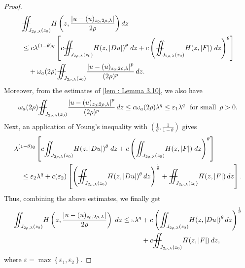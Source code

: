\documentclass[11pt,oneside, english,reqno,twoside a4paper]{amsart}
\theoremstyle{definition}
\numberwithin{theorem}{section}
\numberwithin{equation}{section}
\newcommand{\iintss}{{\int\hspace{-0.28cm}\int}}
\newcommand{ \miints }{{\iintss\hspace{-0.56cm} -\hspace{-0.15cm}-}}
\newcommand{\miint}[1]{{\miints_{\hspace{-0.13cm}#1}}}
\begin{document}
\begin{proof}
\begin{align*}
&\miint{J_{2\rho, \lambda}(z_0)}  H\left(z,\frac{|u-(u)_{z_0, 2\rho, \lambda}|}{2\rho}\right) dz\\
&\leq c \lambda^{(1-\theta)q}\left[c \miint{J_{2\rho,\lambda}(z_0)}H(z,|Du|)^{\theta}\; dz +c\left(\miint{J_{2\rho,\lambda}(z_0)}H(z,|F|)\; d z\right)^{\theta}\right] \\
&\quad +\omega_a(2\rho)\miint{J_{2\rho, \lambda}(z_0)}\frac{\left|u-(u)_{z_0 ; 2 \rho,\lambda}\right|^p}{(2 \rho)^p}\,dz.
\end{align*}
Moreover, from the estimates of  \cref{lem : Lemma 3.10}, we also have
\begin{align*}
    \omega_a(2\rho)\miint{J_{2\rho, \lambda}(z_0)}\frac{\left|u-(u)_{z_0 ; 2 \rho,\lambda}\right|^p}{(2 \rho)^p}\,dz \leq c \omega_a(2\rho)\lambda^q\leq \varepsilon_1 \lambda^q\,\,\,\, \text{for small}\,\,\, \rho>0.
\end{align*}
Next, an application of Young's inequality with $\left(\frac{1}{\theta}, \frac{1}{1-\theta}\right)$ gives
\begin{align*}
  &\lambda^{(1-\theta)q}\left[c \miint{J_{2\rho,\lambda}(z_0)} H(z,|Du|)^{\theta}\; dz +c\left(\miint{J_{2\rho,\lambda}(z_0)}H(z,|F|)\; d z\right)^{\theta}\right]\\
  &\quad \leq \varepsilon_2\lambda^q + c(\varepsilon_2)\left[\left(\miint{J_{2\rho, \lambda}(z_0)}H(z, |Du|)^{\theta}\, dz \right)^{\frac{1}{\theta}}+ \miint{J_{2\rho, \lambda}(z_0)}H(z, |F|)\, dz\right].
\end{align*}
Thus, combining the above estimates, we finally get
\begin{align*}
 \miint{J_{2\rho, \lambda}(z_0)}  H\left(z,\frac{|u-(u)_{z_0, 2\rho, \lambda}|}{2\rho}\right)\; dz \leq \varepsilon \lambda^q&+ c\left(\miint{J_{2\rho, \lambda}(z_0)}H(z, |Du|)^{\theta}\, dz \right)^{\frac{1}{\theta}}\\
 &+ c\miint{J_{2\rho, \lambda}(z_0)}H(z, |F|)\, dz,  
\end{align*}
where $\varepsilon = \max\left\{\varepsilon_1, \varepsilon_2\right\}.$


\end{proof}
\end{document}
